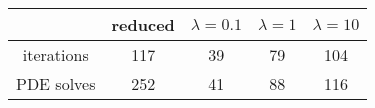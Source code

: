 \begin{tabular}{ccccc}
& reduced & $\lambda = 0.1$ & $\lambda = 1$ & $\lambda = 10$ \\
\hline
iterations & 117 & 39 & 79 & 104 \\
PDE solves & 252 & 41 & 88 & 116 \\
\hline
\end{tabular}
